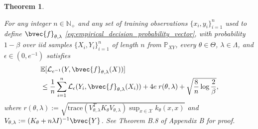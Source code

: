 \documentclass[twoside]{article}
\newtheorem{theorem}{Theorem}[section]
\begin{document}
		
		\begin{theorem}
			\label{thm:expected_risk_bound_hyperparameter_learning_copy}
			
			For any integer $n \in \mathbb{N}_{+}$ and any set of training observations $\{x_{i}, y_{i}\}_{i = 1}^{n}$ used to define $\bvec{f}_{\theta, \lambda}$ \eqref{eq:empirical_decision_probability_vector}, with probability $1 - \beta$ over \textit{iid} samples $\{X_{i}, Y_{i}\}_{i = 1}^{n}$ of length $n$ from $\mathbb{P}_{X Y}$, every $\theta \in \Theta$, $\lambda \in \Lambda$, and $\epsilon \in (0, e^{-1})$ satisfies
			\begin{equation}
			\begin{aligned}
			&\mathbb{E}[\mathcal{L}_{e^{-1}}(Y, \bvec{f}_{\theta, \lambda}(X))] \\
			&\leq \frac{1}{n} \sum_{i = 1}^{n} \mathcal{L}_{\epsilon}(Y_{i}, \bvec{f}_{\theta, \lambda}(X_{i})) + 4 e \; r(\theta, \lambda) + \sqrt{\frac{8}{n} \log{\frac{2}{\beta}}},
			\label{eq:expected_risk_bound_hyperparameter_learning_copy}
			\end{aligned}
			\end{equation}
			where $r(\theta, \lambda) := \sqrt{\mathrm{trace}(V_{\theta, \lambda}^{T} K_{\theta} V_{\theta, \lambda}) \sup_{x \in \mathcal{X}} k_{\theta}(x, x)}$ and $V_{\theta, \lambda} := (K_{\theta} + n \lambda I)^{-1} \bvec{Y}$.
			See Theorem B.8 of Appendix B for proof.
		\end{theorem}
		
\end{document}
